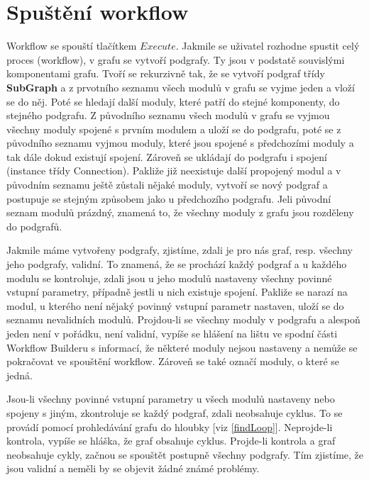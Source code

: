 \newpage
\section{Spuštění workflow}
\nocite{demel:book}
Workflow se spouští tlačítkem $Execute$. Jakmile se uživatel rozhodne
spustit celý proces (workflow), v grafu se vytvoří podgrafy. Ty jsou v
podstatě souvislými komponentami grafu. Tvoří se rekurzivně tak, že se
vytvoří podgraf třídy \textbf{SubGraph} a z prvotního seznamu všech
modulů v grafu se vyjme jeden a vloží se do něj. Poté se hledají další
moduly, které patří do stejné komponenty, do stejného podgrafu. Z
původního seznamu všech modulů v grafu se vyjmou všechny moduly
spojené s prvním modulem a uloží se do podgrafu, poté se z původního
seznamu vyjmou moduly, které jsou spojené s předchozími moduly a tak
dále dokud existují spojení. Zároveň se ukládají do podgrafu i spojení
(instance třídy Connection). Pakliže již neexistuje další propojený
modul a v původním seznamu ještě zůstali nějaké moduly, vytvoří se
nový podgraf a postupuje se stejným způsobem jako u předchozího
podgrafu. Jeli původní seznam modulů prázdný, znamená to, že všechny
moduly z grafu jsou rozděleny do podgrafů.

Jakmile máme vytvořeny podgrafy, zjistíme, zdali je pro nás graf,
resp. všechny jeho podgrafy, validní. To znamená, že se prochází každý
podgraf a u každého modulu se kontroluje, zdali jsou u jeho modulů
nastaveny všechny povinné vstupní parametry, případně jestli u nich
existuje spojení. Pakliže se narazí na modul, u kterého není nějaký
povinný vstupní parametr nastaven, uloží se do seznamu nevalidních
modulů. Projdou-li se všechny moduly v podgrafu a alespoň jeden není v
pořádku, není validní, vypíše se hlášení na lištu ve spodní části
Workflow Builderu s informací, že některé moduly nejsou nastaveny a
nemůže se pokračovat ve spouštění workflow. Zároveň se také označí
moduly, o které se jedná.

Jsou-li všechny povinné vstupní parametry u všech modulů nastaveny
nebo spojeny s jiným, zkontroluje se každý podgraf, zdali neobsahuje
cyklus. To se provádí pomocí prohledávání grafu do hloubky
[viz \lstlistingname \ref{findLoop}]. Neprojde-li kontrola, vypíše se
hláška, že graf obsahuje cyklus. Projde-li kontrola a graf neobsahuje
cykly, začnou se spouštět postupně všechny podgrafy. Tím zjistíme, že
jsou validní a neměli by se objevit žádné známé problémy.


